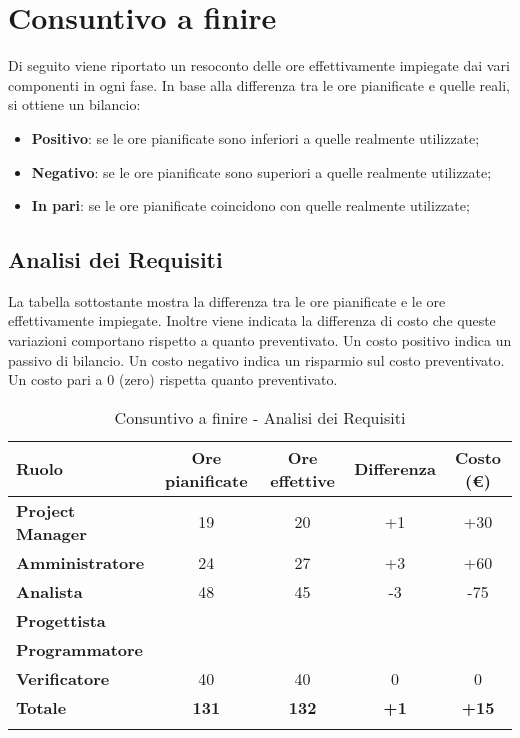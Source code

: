 \section{Consuntivo a finire}

Di seguito viene riportato un resoconto delle ore effettivamente impiegate dai 
vari componenti in ogni fase.
In base alla differenza tra le ore pianificate e quelle reali, si ottiene un bilancio:
\begin{itemize}
	\item \textbf{Positivo}: se le ore pianificate sono inferiori a quelle 
	realmente utilizzate;
	\item \textbf{Negativo}: se le ore pianificate sono superiori a quelle 
	realmente utilizzate;
	\item \textbf{In pari}: se le ore pianificate coincidono con quelle 
	realmente utilizzate;	
\end{itemize}

\subsection{Analisi dei Requisiti}
La tabella sottostante mostra la differenza tra le ore pianificate e le ore effettivamente 
impiegate. Inoltre viene indicata la differenza di costo che 
queste variazioni comportano rispetto a quanto preventivato.
Un costo positivo indica un passivo di bilancio. Un costo negativo indica un 
risparmio sul costo preventivato. Un costo pari a 0 (zero) rispetta quanto 
preventivato.
\begin{center}
	\def\arraystretch{1.6}
	\bgroup
	\begin{longtable}{| p{4cm} | c | c | c | c |}
		\hline
		\textbf{Ruolo} & \textbf{Ore pianificate} & \textbf{Ore effettive} & 
		\textbf{Differenza} & \textbf{Costo (€)}\\ 
		
		\hline \hline  
		
		\textbf{Project Manager} & {19} & {20} & {+1} & {+30} \\ 
		\hline 
		
		\textbf{Amministratore} & {24} & {27} & {+3} & {+60} \\ 
		\hline 
		
		\textbf{Analista} & {48} & {45} & {-3} & {-75} \\ 
		\hline 
		
		\textbf{Progettista} & {} & {} & {} & {} \\ 
		\hline 
		
		\textbf{Programmatore} & {} & {} & {} & {} \\ 
		\hline 
		
		\textbf{Verificatore} & {40} & {40} & {0} & {0} \\ 
		\hline 
		
		\textbf{Totale} & \textbf{131} & \textbf{132} & \textbf{+1} & 
		\textbf{+15} \\ 
		\hline 
		
		
		\hline 
		
		\caption{Consuntivo a finire - Analisi dei Requisiti}
	\end{longtable}
	\egroup
\end{center}


